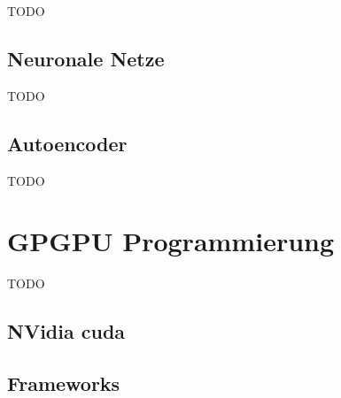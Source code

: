 TODO

\subsection{Neuronale Netze}

TODO

\subsection{Autoencoder}

TODO

\section{GPGPU Programmierung}

TODO

\subsection{NVidia cuda}

\subsection{Frameworks}